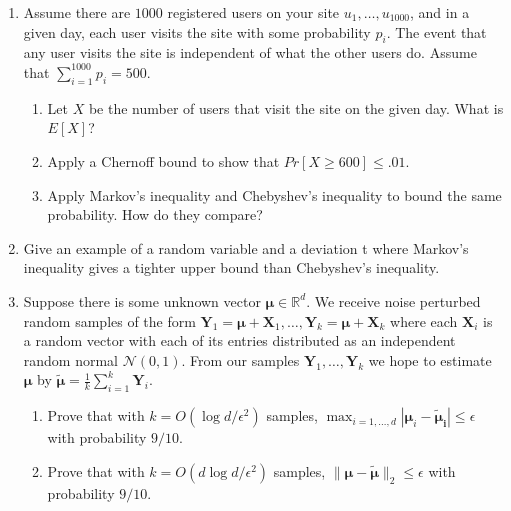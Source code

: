 \documentclass[10pt]{article}
\newcommand{\bs}[1]{\boldsymbol{#1}}
\newcommand{\bv}[1]{\mathbf{#1}}
\newcommand{\R}{\mathbb{R}}
\begin{document}
\begin{enumerate}
		\item Assume there are $1000$ registered users on your site $u_1, \ldots, u_{1000}$, and in a given day, each user
		visits the site with some probability $p_i$. The event that any user visits the site is independent of what the other users do. Assume that $\sum_{i=1}^{1000} p_i = 500$. 
		\begin{enumerate}
			\item  Let $X$ be the number of users that visit the site on the given day. What is $E[X]$?
			\item Apply a Chernoff bound to show that $Pr[X \geq 600] \leq .01$.
			\item Apply Markov’s inequality and Chebyshev’s inequality to bound the same probability.
			How do they compare?
		\end{enumerate}
		\item Give an example of a random variable and a deviation t where Markov’s inequality gives a	tighter upper bound than Chebyshev’s inequality.

		\item Suppose there is some unknown vector $\bs{\mu} \in \R^d$. We receive noise perturbed random samples of the form $\bv{Y}_1 = \bs{\mu} + \bv{X}_1, \ldots, \bv{Y}_k = \bs{\mu} + \bv{X}_k$ where each $\bv{X}_i$ is a random vector with each of its entries distributed as an independent random normal $\mathcal{N}(0,1)$. From our samples $\bv{Y}_1, \ldots, \bv{Y}_k$ we hope to estimate $\bs{\mu}$ by $\bs{\tilde{\mu}} = \frac{1}{k}\sum_{i=1}^k \bv{Y}_i$. 
		\begin{enumerate}
			\item Prove that with $k = O(\log d /\epsilon^2)$ samples, $\max_{i=1,\ldots, d}|\bs{\mu}_i -\bs{\tilde{\mu}_i} | \leq \epsilon$ with probability $9/10$.
			\item Prove that with $k = O(d\log d /\epsilon^2)$ samples, $\|\bs{\mu} -\bs{\tilde{\mu}}\|_2 \leq \epsilon$ with probability $9/10$.
		\end{enumerate}


\end{enumerate}
\end{document}
